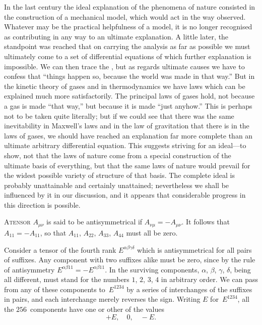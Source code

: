 \documentclass[12pt]{book}
\begin{document}
In the last century the ideal explanation of the phenomena of nature consisted
%
in the construction of a mechanical model, which would act in the way
observed. Whatever may be the practical helpfulness of a model, it is no
longer recognised as contributing in any way to an ultimate explanation. A
little later, the standpoint was reached that on carrying the analysis as far as
possible we must ultimately come to a set of differential equations of which
further explanation is impossible. We can then trace the , but
as regards ultimate causes we have to confess that ``things happen so, because
the world was made in that way.'' But in the kinetic theory of gases and in
thermodynamics we have laws which can be explained much more satisfactorily.
The principal laws of gases hold, not because a gas is made ``that way,'' but
because it is made ``just anyhow.'' This is perhaps not to be taken quite
literally; but if we could see that there was the same inevitability in Maxwell's
laws and in the law of gravitation that there is in the laws of gases, we
should have reached an explanation far more complete than an ultimate arbitrary
differential equation. This suggests striving for an ideal---to show, not
that the laws of nature come from a special construction of the ultimate basis
of everything, but that the same laws of nature would prevail for the widest
possible variety of structure of that basis. The complete ideal is probably
unattainable and certainly unattained; nevertheless we shall be influenced
by it in our discussion, and it appears that considerable progress in this
direction is possible.


%

\lettrine{A}{tensor} $A_{\mu\nu}$ is said to be antisymmetrical if $A_{\nu\mu} = -A_{\mu\nu}$.
It follows that $A_{11} = -A_{11}$, so that $A_{11}$, $A_{22}$, $A_{33}$, $A_{44}$ must all be zero.

Consider a tensor of the fourth rank $E^{\alpha\beta\gamma\delta}$ which is antisymmetrical for
all pairs of suffixes. Any component with two suffixes alike must be zero,
since by the rule of antisymmetry $E^{\alpha\beta11} = -E^{\alpha\beta11}$. In the surviving components,
$\alpha$, $\beta$, $\gamma$, $\delta$, being all different, must stand for the numbers $1$, $2$, $3$, $4$
in arbitrary order. We can pass from any of these components to~$E^{1234}$ by a
series of interchanges of the suffixes in pairs, and each interchange merely
reverses the sign. Writing $E$ for~$E^{1234}$, all the $256$~components have one or
other of the values
\[
+E,\quad 0,\quad -E.
\]
\end{document}
